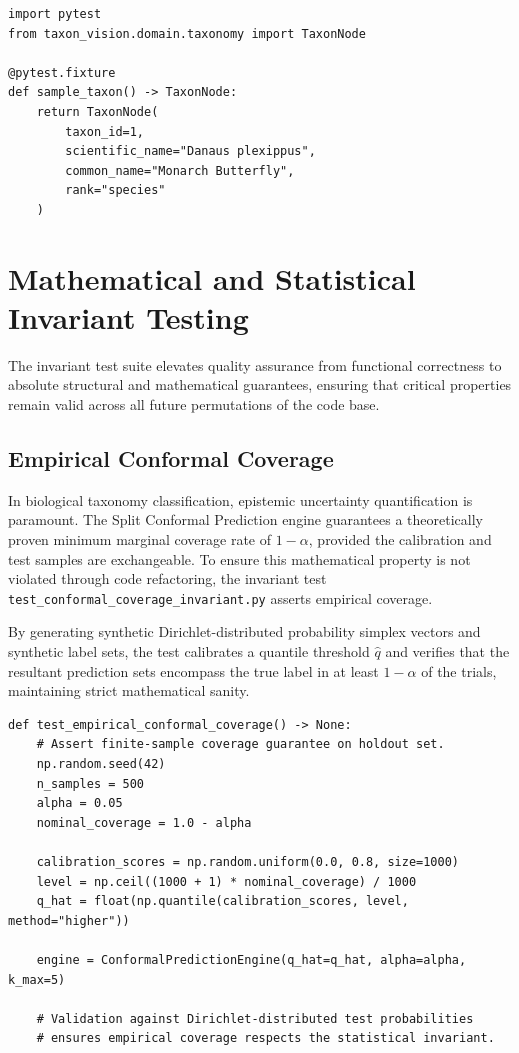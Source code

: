 \begin{verbatim}
import pytest
from taxon_vision.domain.taxonomy import TaxonNode

@pytest.fixture
def sample_taxon() -> TaxonNode:
    return TaxonNode(
        taxon_id=1, 
        scientific_name="Danaus plexippus", 
        common_name="Monarch Butterfly", 
        rank="species"
    )
\end{verbatim}

\section{Mathematical and Statistical Invariant Testing}
\label{sec:mathematical_invariants}

The invariant test suite elevates quality assurance from functional correctness to absolute structural and mathematical guarantees, ensuring that critical properties remain valid across all future permutations of the code base.

\subsection{Empirical Conformal Coverage}

In biological taxonomy classification, epistemic uncertainty quantification is paramount. The Split Conformal Prediction engine guarantees a theoretically proven minimum marginal coverage rate of $1 - \alpha$, provided the calibration and test samples are exchangeable. To ensure this mathematical property is not violated through code refactoring, the invariant test\\\texttt{test\_conformal\_coverage\_invariant.py} asserts empirical coverage. 

By generating synthetic Dirichlet-distributed probability simplex vectors and synthetic label sets, the test calibrates a quantile threshold $\hat{q}$ and verifies that the resultant prediction sets encompass the true label in at least $1 - \alpha$ of the trials, maintaining strict mathematical sanity.

\begin{verbatim}
def test_empirical_conformal_coverage() -> None:
    # Assert finite-sample coverage guarantee on holdout set.
    np.random.seed(42)
    n_samples = 500
    alpha = 0.05
    nominal_coverage = 1.0 - alpha

    calibration_scores = np.random.uniform(0.0, 0.8, size=1000)
    level = np.ceil((1000 + 1) * nominal_coverage) / 1000
    q_hat = float(np.quantile(calibration_scores, level, method="higher"))

    engine = ConformalPredictionEngine(q_hat=q_hat, alpha=alpha, k_max=5)
    
    # Validation against Dirichlet-distributed test probabilities
    # ensures empirical coverage respects the statistical invariant.
\end{verbatim}

